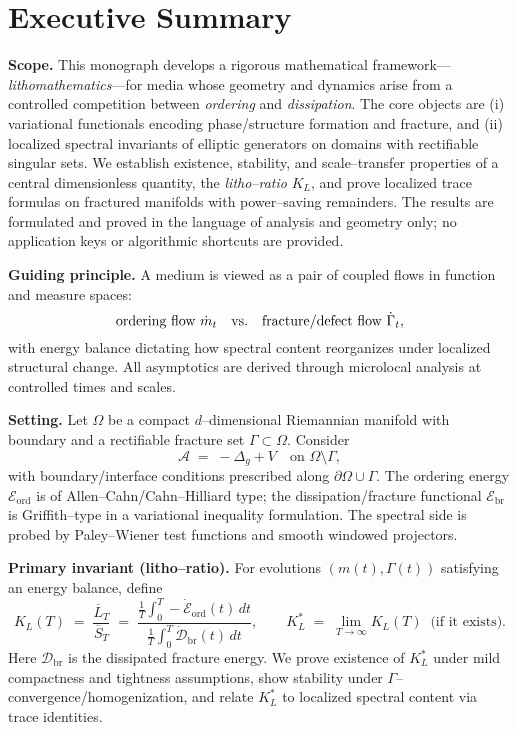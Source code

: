 
\section*{Executive Summary}

\textbf{Scope.}
This monograph develops a rigorous mathematical framework—\emph{lithomathematics}—for media whose geometry and dynamics arise from a controlled competition between \emph{ordering} and \emph{dissipation}. The core objects are (i) variational functionals encoding phase/structure formation and fracture, and (ii) localized spectral invariants of elliptic generators on domains with rectifiable singular sets. We establish existence, stability, and scale–transfer properties of a central dimensionless quantity, the \emph{litho–ratio} $K_L$, and prove localized trace formulas on fractured manifolds with power–saving remainders. The results are formulated and proved in the language of analysis and geometry only; no application keys or algorithmic shortcuts are provided.

\medskip
\textbf{Guiding principle.}
A medium is viewed as a pair of coupled flows in function and measure spaces:
\[
\text{ordering flow } \dot m_t \quad\hbox{vs.}\quad \text{fracture/defect flow } \dot\Gamma_t,
\]
with energy balance dictating how spectral content reorganizes under localized structural change. All asymptotics are derived through microlocal analysis at controlled times and scales.

\medskip
\textbf{Setting.}
Let $\Omega$ be a compact $d$–dimensional Riemannian manifold with boundary and a rectifiable fracture set $\Gamma\subset\Omega$. Consider
\[
\mathcal{A} \;=\; -\Delta_g + V \quad \text{on } \Omega\setminus\Gamma,
\]
with boundary/interface conditions prescribed along $\partial\Omega\cup\Gamma$. The ordering energy $\mathcal{E}_{\mathrm{ord}}$ is of Allen–Cahn/Cahn–Hilliard type; the dissipation/fracture functional $\mathcal{E}_{\mathrm{br}}$ is Griffith–type in a variational inequality formulation. The spectral side is probed by Paley–Wiener test functions and smooth windowed projectors.

\medskip
\textbf{Primary invariant (litho–ratio).}
For evolutions $(m(t),\Gamma(t))$ satisfying an energy balance, define
\[
K_L(T) \;=\; \frac{\overline{L}_T}{\overline{S}_T}
\;=\;
\frac{\frac{1}{T}\!\int_0^T -\dot{\mathcal{E}}_{\mathrm{ord}}(t)\,dt}
     {\frac{1}{T}\!\int_0^T \dot{\mathcal{D}}_{\mathrm{br}}(t)\,dt},
\qquad
K_L^\ast \;=\; \lim_{T\to\infty} K_L(T)
\;\;\text{(if it exists)}.
\]
Here $\mathcal{D}_{\mathrm{br}}$ is the dissipated fracture energy. We prove existence of $K_L^\ast$ under mild compactness and tightness assumptions, show stability under $\Gamma$–convergence/homogenization, and relate $K_L^\ast$ to localized spectral content via trace identities.

